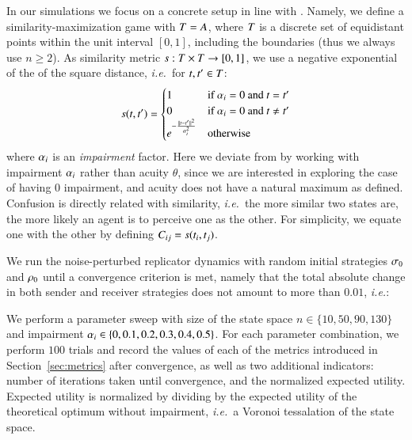 In our simulations we focus on a concrete setup in line with \cite{Correia2013:The-Bivalent-Tr}.
Namely, we define a similarity-maximization game with $T = A$, where $T$ is a discrete set of equidistant points within the unit interval $[0,1]$, including the boundaries (thus we always use $n \geq 2$).
As similarity metric $s:T \times T \rightarrow [0,1]$, we use a negative exponential of the of the square distance, \emph{i.e.}~for $t,t^\prime \in T$:
\begin{align*}
  s(t,t^\prime) =
    \begin{cases}
    1 & \textrm{if } \alpha_i = 0 \textrm{ and } t = t^\prime \\
    0 & \textrm{if } \alpha_i = 0 \textrm{ and } t \neq t^\prime \\
    e^{-\frac{\lVert t - t^\prime \rVert ^2}{\alpha_i^2}} & \textrm{otherwise} \\
    \end{cases}
\end{align*}
where $\alpha_i$ is an \emph{impairment} factor.
Here we deviate from \cite{Correia2013:The-Bivalent-Tr} by working with impairment $\alpha_i$ rather than acuity $\theta$, since we are interested in exploring the case of having $0$ impairment, and acuity does not have a natural maximum as defined.
Confusion is directly related with similarity, \emph{i.e.}~the more similar two states are, the more likely an agent is to perceive one as the other.
For simplicity, we equate one with the other by defining $C_{ij} = s(t_i,t_j)$.

We run the noise-perturbed replicator dynamics with random initial strategies $\sigma_0$ and $\rho_0$ until a convergence criterion is met, namely that the total absolute change in both sender and receiver strategies does not amount to more than $0.01$, \emph{i.e.}:


We perform a parameter sweep with size of the state space $n \in \{10,
50, 90, 130\}$ and impairment $\alpha_i \in \{0, 0.1, 0.2, 0.3,
0.4, 0.5\}$.
For each parameter combination, we perform $100$ trials and record the values of each of the metrics introduced in Section~\ref{sec:metrics} after convergence, as well as two additional indicators: number of iterations taken until convergence, and the normalized expected utility.
Expected utility is normalized by dividing by the expected utility of the theoretical optimum without impairment, \emph{i.e.}~a Voronoi tessalation of the state space. 

